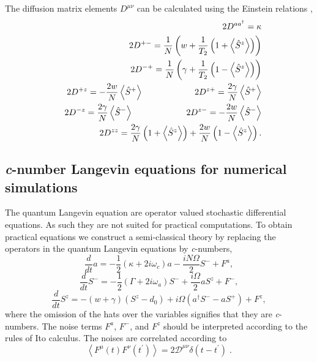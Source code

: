 \documentclass[aps,
twocolumn,
superscriptaddress,groupedaddress]{revtex4}
\begin{document}
The diffusion matrix elements $D^{\mu \nu} $ can be calculated using the
Einstein relations \cite{meystre2007elements},
\begin{eqnarray}
&& 2D^{a a^{\dagger}}= \kappa \nonumber \\
&& 2D^{+-}= \frac{1}{N}
\left(
  w + \frac{1}{T_2} \left(1 + \left< \hat{S}^{z} \right> \right)
\right) \nonumber \\
&& 2D^{-+}= \frac{1}{N}
\left(
  \gamma + \frac{1}{T_2} \left(1- \left< \hat{S}^{z} \right> \right)
\right) \nonumber \\
&& 2D^{+z}= -\frac{2w}{N} \left< \hat{S}^{+} \right>
\hspace{0.83in} 2D^{z+}= \frac{2\gamma}{N} \left< \hat{S}^{+} \right>
\nonumber \\
&& 2D^{-z}= \frac{2\gamma}{N} \left< \hat{S}^{-} \right>
\hspace{0.86in} 2D^{z-}= -\frac{2w}{N} \left< \hat{S}^{-} \right>
\nonumber \\
&& 2D^{zz}= \frac{2\gamma}{N}
\left(1+ \left< \hat{S}^{z} \right> \right) +
\frac{2w}{N}\left(1- \left< \hat{S}^{z} \right> \right).
\label{OpNoise1}
\end{eqnarray}


\subsection{{\it c}-number Langevin equations for numerical simulations}

The quantum Langevin equation are operator valued stochastic
differential equations.  As such they are not suited for practical
computations.  To obtain practical equations we construct a
semi-classical theory by replacing the operators in the quantum Langevin
equations by {\it c}-numbers,
\begin{equation}
\frac{d}{dt} a= -\frac{1}{2}  (\kappa +2i\omega_c) a
-\frac{i N \Omega}{2} S^{-}
+F^{a},
\label{Lac}
\end{equation}
\begin{equation}
\frac{d}{dt} S^{-} = -\frac{1}{2}  \left(\Gamma +2 i \omega_a \right)  S^{-}
+\frac{i \Omega}{2} a S^{z}
+F^{-},
\end{equation}
\begin{equation}
\frac{d}{dt} S^{z} = -(w+\gamma)\left( S^{z} - d_0\right)
+i\Omega \left( a^{\dagger}S^{-} - a S^{+} \right)
\label{Lszc}
+F^{z},
\end{equation}
where the omission of the hats over the variables signifies that they
are {\it c}-numbers.  The noise terms $F^a$, $F^-$, and $F^z$ should be
interpreted according to the rules of Ito calculus.  The noises are
correlated according to
\begin{equation}
\left< F^{\mu}(t) F^{\nu}(t^{\prime})\right> =
2 \mathscr{D}^{\mu \nu} \delta(t-t^{\prime})\;.
\label{ClassicalDiffusion1}
\end{equation}
\end{document}
